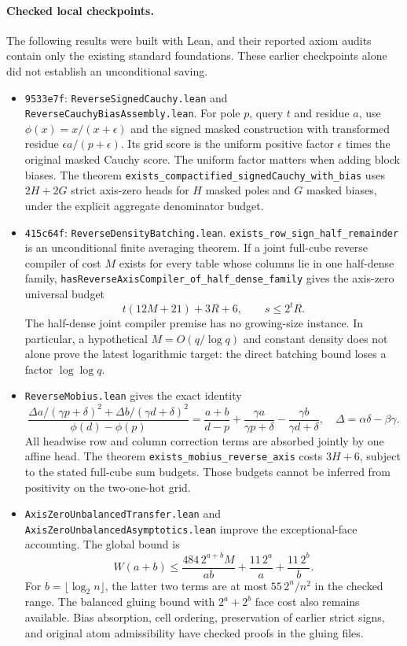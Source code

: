 \documentclass[11pt]{article}
\begin{document}
\paragraph{Checked local checkpoints.}
The following results were built with Lean, and their reported axiom
audits contain only the existing standard foundations. These earlier
checkpoints alone did not establish an unconditional saving.
\begin{itemize}
\item \texttt{9533e7f}: \texttt{ReverseSignedCauchy.lean} and
\texttt{ReverseCauchyBiasAssembly.lean}. For pole $p$, query $t$ and
residue $a$, use $\phi(x)=x/(x+\epsilon)$ and the signed masked
construction with transformed residue $\epsilon a/(p+\epsilon)$.
Its grid score is the uniform positive factor $\epsilon$ times the
original masked Cauchy score. The uniform factor matters when adding
block biases. The theorem
\texttt{exists\_compactified\_signedCauchy\_with\_bias} uses
$2H+2G$ strict axis-zero heads for $H$ masked poles and $G$ masked
biases, under the explicit aggregate denominator budget.
\item \texttt{415c64f}: \texttt{ReverseDensityBatching.lean}.
\texttt{exists\_row\_sign\_half\_remainder} is an unconditional finite
averaging theorem. If a joint full-cube reverse compiler of cost $M$
exists for every table whose columns lie in one half-dense family,
\texttt{hasReverseAxisCompiler\_of\_half\_dense\_family} gives the
axis-zero universal budget
\[
 t(12M+21)+3R+6,\qquad s\leq2^tR.
\]
The half-dense joint compiler premise has no growing-size instance.
In particular, a hypothetical $M=O(q/\log q)$ and constant density
does not alone prove the latest logarithmic target: the direct
batching bound loses a factor $\log\log q$.
\item \texttt{ReverseMobius.lean} gives the exact identity
\[
 \frac{\Delta a/(\gamma p+\delta)^2+
             \Delta b/(\gamma d+\delta)^2}
      {\phi(d)-\phi(p)}
 =\frac{a+b}{d-p}+\frac{\gamma a}{\gamma p+\delta}
                    -\frac{\gamma b}{\gamma d+\delta},
 \quad \Delta=\alpha\delta-\beta\gamma.
\]
All headwise row and column correction terms are absorbed jointly by
one affine head. The theorem \texttt{exists\_mobius\_reverse\_axis}
costs $3H+6$, subject to the stated full-cube sum budgets. Those
budgets cannot be inferred from positivity on the two-one-hot grid.
\item \texttt{AxisZeroUnbalancedTransfer.lean} and
\texttt{AxisZeroUnbalancedAsymptotics.lean} improve the exceptional-face
accounting. The global bound is
\[
 W(a+b)\leq\frac{484\,2^{a+b}M}{ab}
              +\frac{11\,2^a}{a}+\frac{11\,2^b}{b}.
\]
For $b=\lfloor\log_2n\rfloor$, the latter two terms are at most
$55\,2^n/n^2$ in the checked range. The balanced gluing bound with
$2^a+2^b$ face cost also remains available. Bias absorption, cell
ordering, preservation of earlier strict signs, and original atom
admissibility have checked proofs in the gluing files.
\end{itemize}
\end{document}
